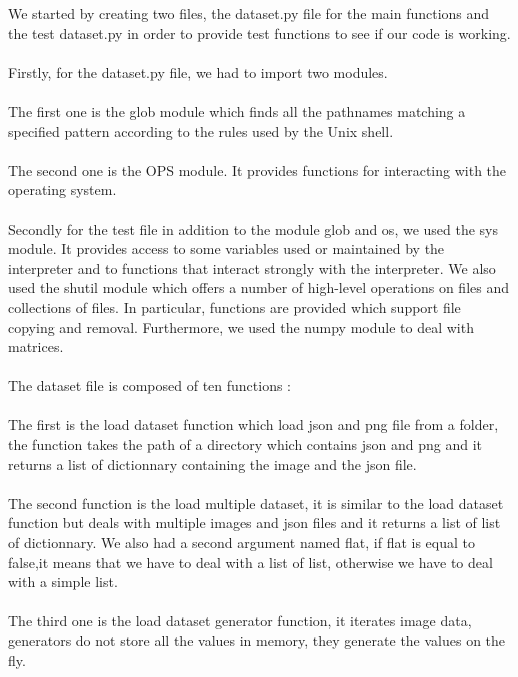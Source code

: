 \documentclass[12pt]{article}
\begin{document}
We started by creating two files, the dataset.py file for the main functions and the test dataset.py in order to provide test functions to see if our code is working.\\ \\ 

Firstly, for the dataset.py file, we had to import  two modules. \\ \\
The first one is the glob module which finds all the pathnames matching a specified pattern according to the rules used by the Unix shell.\\ \\
The second one is the OPS module. It provides functions for interacting with the operating system.\\ \\

Secondly for the test file in addition to the module glob and os, we used the sys module. It provides access to some variables used or maintained by the interpreter and to functions that interact strongly with the interpreter.
We also used the shutil module which offers a number of high-level operations on files and collections of files. In particular, functions are provided which support file copying and removal. Furthermore, we used the numpy module to deal with matrices.\\ \\


The dataset file is composed of ten functions :\\ \\

The first is the load dataset function which load json and png file from a folder, the function takes the path of a directory which contains json and png and it returns a list of dictionnary containing the image and the json file.\\ \\

The second function is the load multiple dataset, it is similar to the load dataset function but deals with multiple images and json files and it returns a list of list of dictionnary.  We also had a second argument named flat, if flat is equal to false,it means that we have to deal with a list of list, otherwise we have to deal with a simple list.\\ \\

The third one is the load dataset generator function, it iterates image data, generators do not store all the values in memory, they generate the values on the fly.\\ \\
\end{document}
